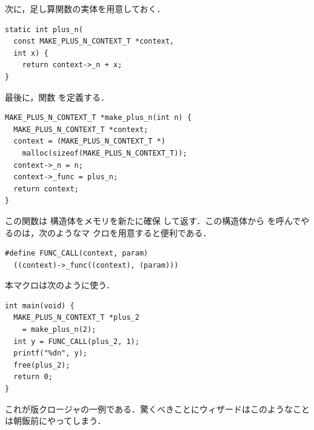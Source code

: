 \documentclass[a5paper,twoside,fleqn,draft]{jsbook}
\begin{document}
次に，足し算関数の実体を用意しておく．
\begin{ccode}
\begin{verbatim}
static int plus_n(
  const MAKE_PLUS_N_CONTEXT_T *context,
  int x) {
    return context->_n + x;
}
\end{verbatim}
\end{ccode}

最後に，関数  を定義する．
\begin{ccode}
\begin{verbatim}
MAKE_PLUS_N_CONTEXT_T *make_plus_n(int n) {
  MAKE_PLUS_N_CONTEXT_T *context;
  context = (MAKE_PLUS_N_CONTEXT_T *)
    malloc(sizeof(MAKE_PLUS_N_CONTEXT_T));
  context->_n = n;
  context->_func = plus_n;
  return context;
}
\end{verbatim}
\end{ccode}
この関数は  構造体をメモリを新たに確保
して返す．この構造体から  を呼んでやるのは，次のようなマ
クロを用意すると便利である．
\begin{ccode}
\begin{verbatim}
#define FUNC_CALL(context, param)
  ((context)->_func((context), (param)))
\end{verbatim}
\end{ccode}
本マクロは次のように使う．
\begin{ccode}
\begin{verbatim}
int main(void) {
  MAKE_PLUS_N_CONTEXT_T *plus_2
    = make_plus_n(2);
  int y = FUNC_CALL(plus_2, 1);
  printf("%dn", y);
  free(plus_2);
  return 0;
}
\end{verbatim}
\end{ccode}
これが\clang 版クロージャの一例である．驚くべきことに\clang ウィザードはこのようなことは朝飯前にやってしまう．

\end{document}
